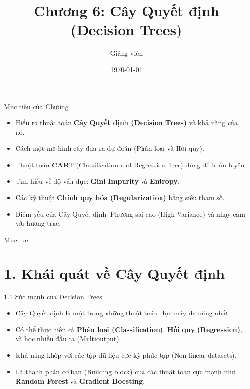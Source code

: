 \documentclass[aspectratio=169, 12pt]{beamer}
\title[ML - Chap 06]{Chương 6: Cây Quyết định (Decision Trees)}
\author[Giảng viên]{Giảng viên}
\institute[Đại học Đông Á]{Đại học Đông Á}
\date{\today}
\begin{document}
\begin{frame}
    \titlepage
\end{frame}

\begin{frame}{Mục tiêu của Chương}
    \begin{itemize}
        \item Hiểu rõ thuật toán \textbf{Cây Quyết định (Decision Trees)} và khả năng của nó.
        \item Cách một mô hình cây đưa ra dự đoán (Phân loại và Hồi quy).
        \item Thuật toán \textbf{CART} (Classification and Regression Tree) dùng để huấn luyện.
        \item Tìm hiểu về độ vẩn đục: \textbf{Gini Impurity} và \textbf{Entropy}.
        \item Các kỹ thuật \textbf{Chính quy hóa (Regularization)} bằng siêu tham số.
        \item Điểm yếu của Cây Quyết định: Phương sai cao (High Variance) và nhạy cảm với hướng trục.
    \end{itemize}
\end{frame}

\begin{frame}{Mục lục}
    \tableofcontents
\end{frame}

\section{1. Khái quát về Cây Quyết định}

\begin{frame}{1.1 Sức mạnh của Decision Trees}
    \begin{itemize}
        \item Cây Quyết định là một trong những thuật toán Học máy đa năng nhất.
        \item Có thể thực hiện cả \textbf{Phân loại (Classification)}, \textbf{Hồi quy (Regression)}, và học nhiều đầu ra (Multioutput).
        \item Khả năng khớp với các tập dữ liệu cực kỳ phức tạp (Non-linear datasets).
        \item Là thành phần cơ bản (Building block) của các thuật toán cực mạnh như \textbf{Random Forest} và \textbf{Gradient Boosting}.
    \end{itemize}
\end{frame}
\end{document}
